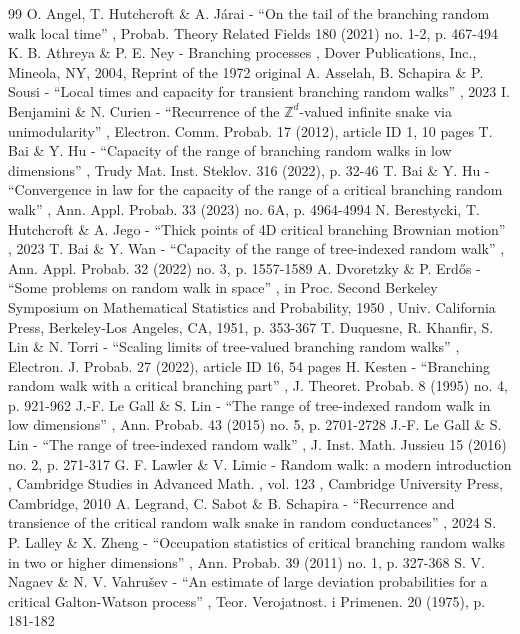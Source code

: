 \begin{thebibliography}{99}
 O. Angel, T. Hutchcroft \& A. Járai - “On the tail of the branching random walk local time” , Probab. Theory Related Fields 180 (2021) no. 1-2, p. 467-494
 K. B. Athreya \& P. E. Ney - Branching processes , Dover Publications, Inc., Mineola, NY, 2004, Reprint of the 1972 original
 A. Asselah, B. Schapira \& P. Sousi - “Local times and capacity for transient branching random walks” , 2023
 I. Benjamini \& N. Curien - “Recurrence of the $\mathbb{Z}^d$-valued infinite snake via unimodularity” , Electron. Comm. Probab. 17 (2012), article ID 1, 10 pages
 T. Bai \& Y. Hu - “Capacity of the range of branching random walks in low dimensions” , Trudy Mat. Inst. Steklov. 316 (2022), p. 32-46
 T. Bai \& Y. Hu - “Convergence in law for the capacity of the range of a critical branching random walk” , Ann. Appl. Probab. 33 (2023) no. 6A, p. 4964-4994
 N. Berestycki, T. Hutchcroft \& A. Jego - “Thick points of 4D critical branching Brownian motion” , 2023
 T. Bai \& Y. Wan - “Capacity of the range of tree-indexed random walk” , Ann. Appl. Probab. 32 (2022) no. 3, p. 1557-1589
 A. Dvoretzky \& P. Erdős - “Some problems on random walk in space” , in Proc. Second Berkeley Symposium on Mathematical Statistics and Probability, 1950 , Univ. California Press, Berkeley-Los Angeles, CA, 1951, p. 353-367
 T. Duquesne, R. Khanfir, S. Lin \& N. Torri - “Scaling limits of tree-valued branching random walks” , Electron. J. Probab. 27 (2022), article ID 16, 54 pages
 H. Kesten - “Branching random walk with a critical branching part” , J. Theoret. Probab. 8 (1995) no. 4, p. 921-962
 J.-F. Le Gall \& S. Lin - “The range of tree-indexed random walk in low dimensions” , Ann. Probab. 43 (2015) no. 5, p. 2701-2728
 J.-F. Le Gall \& S. Lin - “The range of tree-indexed random walk” , J. Inst. Math. Jussieu 15 (2016) no. 2, p. 271-317
 G. F. Lawler \& V. Limic - Random walk: a modern introduction , Cambridge Studies in Advanced Math. , vol. 123 , Cambridge University Press, Cambridge, 2010
 A. Legrand, C. Sabot \& B. Schapira - “Recurrence and transience of the critical random walk snake in random conductances” , 2024
 S. P. Lalley \& X. Zheng - “Occupation statistics of critical branching random walks in two or higher dimensions” , Ann. Probab. 39 (2011) no. 1, p. 327-368
 S. V. Nagaev \& N. V. Vahrušev - “An estimate of large deviation probabilities for a critical Galton-Watson process” , Teor. Verojatnost. i Primenen. 20 (1975), p. 181-182

\end{thebibliography}
